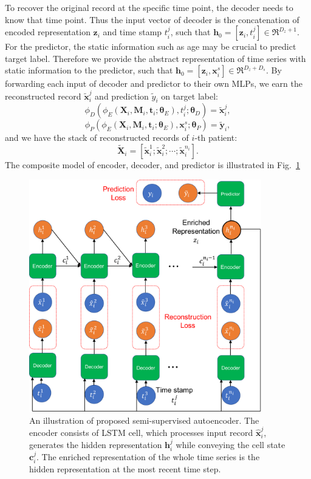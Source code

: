 To recover the original record at the specific time point, the decoder needs to know that time point. Thus the input vector of decoder is the concatenation of encoded representation $\mathbf{z}_i$ and time stamp $t^j_i$, such that $\mathbf{h}_0 = [\mathbf{z}_i, t_i^j] \in \Re^{D_z + 1}$. For the predictor, the static information such as age may be crucial to predict target label. Therefore we provide the abstract representation of time series with static information to the predictor, such that $\mathbf{h}_0 = [\mathbf{z}_i, \mathbf{x}_i^s] \in \Re^{D_z + D_s}$. By forwarding each input of decoder and predictor to their own MLPs, we earn the reconstructed record $\tilde{\mathbf{x}}_i^j$ and prediction $\tilde{y}_i$ on target label:
\begin{equation}
    \phi_D(\phi_E(\mathbf{X}_i, \mathbf{M}_i, \mathbf{t}_i; \mathbf{\theta}_E), t_i^j; \mathbf{\theta}_D) = \tilde{\mathbf{x}}_i^j,
\end{equation}
\begin{equation}
    \phi_P(\phi_E(\mathbf{X}_i, \mathbf{M}_i, \mathbf{t}_i; \mathbf{\theta}_E), \mathbf{x}_i^s; \mathbf{\theta}_P) = \tilde{\mathbf{y}}_i,
\end{equation}
and we have the stack of reconstructed records of $i$-th patient:
\begin{equation}
    \tilde{\mathbf{X}}_i = [\tilde{\mathbf{x}}_i^1; \tilde{\mathbf{x}}_i^2; \cdots; \tilde{\mathbf{x}}_i^{n_i}].
\end{equation}
The composite model of encoder, decoder, and predictor is illustrated in Fig.~\ref{fig: autoencoder}
\begin{figure}[t]
    \centering
    \includegraphics[width=0.9\textwidth]{figures/autoencoder.pdf}
    \caption{An illustration of proposed semi-supervised autoencoder. The encoder consists of LSTM cell, which processes input record $\mathbf{\hat{x}}_i^j$, generates the hidden representation $\mathbf{h}_i^j$ while conveying the cell state $\mathbf{c}_i^j$. The enriched representation of the whole time series is the hidden representation at the most recent time step.} \label{fig: autoencoder}
\end{figure}
